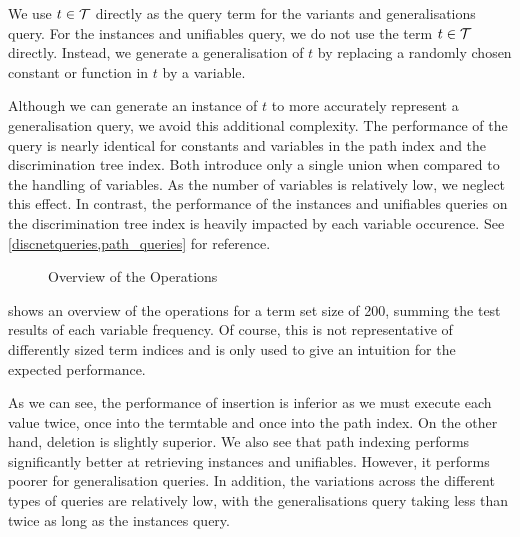 We use $t \in \mathcal{T}$ directly as the query term for the variants and generalisations query.
For the instances and unifiables query, we do not use the term $t \in \mathcal{T}$ directly.
Instead, we generate a generalisation of $t$ by replacing a randomly chosen constant or function in $t$ by a variable.

Although we can generate an instance of $t$ to more accurately represent a generalisation query, we avoid this additional complexity. The performance of the query is nearly identical for constants and variables in the path index and the discrimination tree index. Both introduce only a single union when compared to the handling of variables. As the number of variables is relatively low, we neglect this effect. In contrast, the performance of the instances and unifiables queries on the discrimination tree index is heavily impacted by each variable occurence. See \cref{discnetqueries,path_queries} for reference.

\begin{figure}[h]
  \centering
{}
\caption{Overview of the Operations}
\label{queries}
\end{figure}

 shows an overview of the operations for a term set size of 200, summing the test results of each variable frequency. Of course, this is not representative of differently sized term indices and is only used to give an intuition for the expected performance.

As we can see, the performance of insertion is inferior as we must execute each value twice, once into the termtable and once into the path index. On the other hand, deletion is slightly superior. We also see that path indexing performs significantly better at retrieving instances and unifiables. However, it performs poorer for generalisation queries. In addition, the variations across the different types of queries are relatively low, with the generalisations query taking less than twice as long as the instances query.

